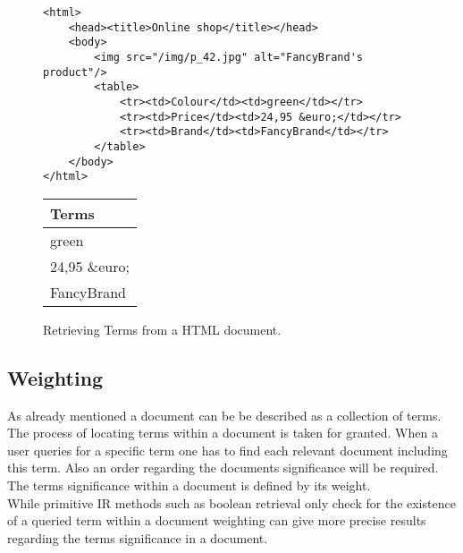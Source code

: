 \begin{figure}[h]
    \center
    \begin{lstlisting}
<html>
    <head><title>Online shop</title></head>
    <body>
        <img src="/img/p_42.jpg" alt="FancyBrand's product"/>
        <table>
            <tr><td>Colour</td><td>green</td></tr>
            <tr><td>Price</td><td>24,95 &euro;</td></tr>
            <tr><td>Brand</td><td>FancyBrand</td></tr>
        </table>
    </body>
</html>
    \end{lstlisting}
    \begin{tabular}{ l }
        \rowcolor{\dustRowHead}
        \textbf{Terms}\\\hline
        green\\
        24,95 \&euro;\\
        FancyBrand%
    \end{tabular}
    \caption{Retrieving Terms from a HTML document.}
    \label{fig:TermRetrieving}
\end{figure}


\subsection{Weighting}
\label{sec:weighting}
As already mentioned a document can be be described as a collection of terms.
The process of locating terms within a document is taken for granted.
When a user queries for a specific term one has to find each relevant document including this term.
Also an order regarding the documents significance will be required.
The terms significance within a document is defined by its weight.\citep[p.~117]{manning:2009}\\
While primitive IR methods such as boolean retrieval only check for the existence of a queried term within a document weighting can give more precise results regarding the terms significance in a document.\citep[p.~109]{manning:2009}

